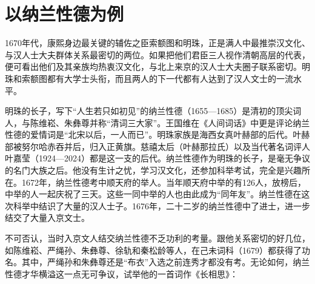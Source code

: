 \begin{sectionnotes}





\end{sectionnotes}
\section{以纳兰性德为例}


1670年代，康熙身边最关键的辅佐之臣索额图和明珠，正是满人中最推崇汉文化、与汉人士大夫群体关系最密切的两位。如果把他们君臣三人视作清朝高层的代表，便可看出他们及其亲族均热衷汉文化，与北上来京的汉人士大夫圈子联系密切。明珠和索额图都有大学士头衔，而且两人的下一代都有人达到了汉人文士的一流水平。



明珠的长子，写下“人生若只如初见”的纳兰性德（1655—1685）是清初的顶尖词人，与陈维崧、朱彝尊并称“清词三大家”。王国维在《人间词话》中更是评论纳兰性德的爱情词是“北宋以后，一人而已”。明珠家族是海西女真叶赫部的后代。叶赫部被努尔哈赤吞并后，归入正黄旗。慈禧太后（叶赫那拉氏）以及当代著名词评人叶嘉莹（1924—2024）都是这一支的后代。纳兰性德作为明珠的长子，是毫无争议的名门大族之后。他没有生计之忧，学习汉文化，还参加科举考试，完全是兴趣所在。1672年，纳兰性德考中顺天府的举人。当年顺天府中举的有126人，放榜后，中举的人一起庆祝了三天。这些一同中举的人也由此成为“同年友”。纳兰性德在这次科举中结识了大量的汉人士子。1676年，二十二岁的纳兰性德中了进士，进一步结交了大量入京文士。



不可否认，当时入京文人结交纳兰性德不乏功利的考量。跟他关系密切的好几位，如陈维崧、严绳孙、朱彝尊、徐轨和秦松龄等人，在己未词科（1679）都获得了功名。其中，严绳孙和朱彝尊还是“布衣”入选之前连秀才都没有考。无论如何，纳兰性德才华横溢这一点无可争议，试举他的一首词作《长相思》：


